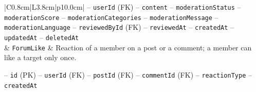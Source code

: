 \begin{center}
\begin{longtable}{|C{0.8cm}|L{3.8cm}|p{10.0cm}|}
\hspace*{1em}-- \texttt{user\allowbreak Id} (FK) \newline
\hspace*{1em}-- \texttt{content} \newline
\hspace*{1em}-- \texttt{moderation\allowbreak Status} \newline
\hspace*{1em}-- \texttt{moderation\allowbreak Score} \newline
\hspace*{1em}-- \texttt{moderation\allowbreak Categories} \newline
\hspace*{1em}-- \texttt{moderation\allowbreak Message} \newline
\hspace*{1em}-- \texttt{moderation\allowbreak Language} \newline
\hspace*{1em}-- \texttt{reviewed\allowbreak By\allowbreak Id} (FK) \newline
\hspace*{1em}-- \texttt{reviewed\allowbreak At} \newline
\hspace*{1em}-- \texttt{created\allowbreak At} \newline
\hspace*{1em}-- \texttt{updated\allowbreak At} \newline
\hspace*{1em}-- \texttt{deleted\allowbreak At} \\
 & \texttt{Forum\allowbreak Like} & Reaction of a member on a post or a comment; a member can like a target only once.\par\smallskip
\hspace*{1em}-- \texttt{id} (PK) \newline
\hspace*{1em}-- \texttt{user\allowbreak Id} (FK) \newline
\hspace*{1em}-- \texttt{post\allowbreak Id} (FK) \newline
\hspace*{1em}-- \texttt{comment\allowbreak Id} (FK) \newline
\hspace*{1em}-- \texttt{reaction\allowbreak Type} \newline
\hspace*{1em}-- \texttt{created\allowbreak At} \\ \hline
\hline
\end{longtable}\addtocounter{table}{-1}
\end{center}

